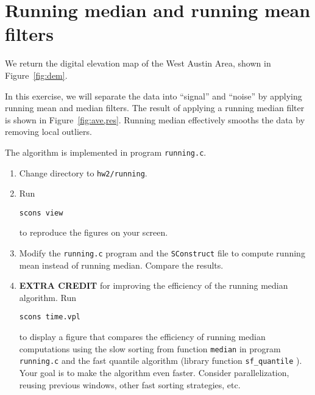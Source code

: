 \section{Running median and running mean filters}


We return the digital elevation map of the West Austin Area, shown in Figure~\ref{fig:dem}.

In this exercise, we will separate the data into ``signal'' and
``noise'' by applying running mean and median filters.  The result of
applying a running median filter is shown in
Figure~\ref{fig:ave,res}. Running median effectively smooths the data
by removing local outliers.


The algorithm is implemented in program \texttt{running.c}.

\lstset{language=c,numbers=left,numberstyle=\tiny,showstringspaces=false}


\begin{enumerate}
\item Change directory to \texttt{hw2/running}.
\item Run 
\begin{verbatim}
scons view
\end{verbatim}
to reproduce the figures on your screen.
\item Modify the \texttt{running.c} program and the
  \texttt{SConstruct} file to compute running mean instead of running
  median. Compare the results.
\item \textbf{EXTRA CREDIT} for improving the efficiency of the
  running median algorithm. Run
\begin{verbatim}
scons time.vpl
\end{verbatim}
  to display a figure that compares the efficiency of running median
  computations using the slow sorting from function \texttt{median} in
  program \texttt{running.c} and the fast quantile algorithm (library
  function \texttt{sf\_quantile} ). Your goal is to make the algorithm
  even faster. Consider parallelization, reusing previous windows,
  other fast sorting strategies, etc.
\end{enumerate}

